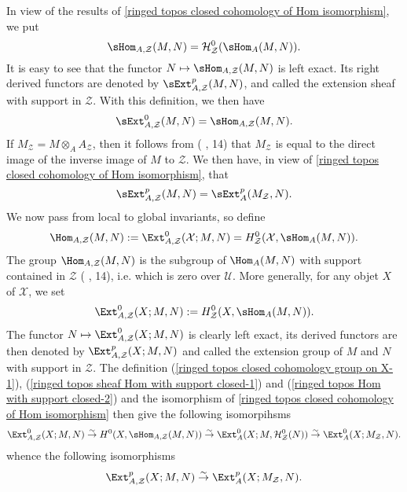 In view of the results of \cref{ringed topos closed cohomology of Hom isomorphism}, we put
\begin{equation}\label{ringed topos sheaf Hom with support closed-1}
\sHom_{A,\mathcal{Z}}(M,N)=\mathcal{H}^0_\mathcal{Z}(\sHom_A(M,N)).
\end{equation}
It is easy to see that the functor $N\mapsto\sHom_{A,\mathcal{Z}}(M,N)$ is left exact. Its right derived functors are denoted by $\sExt_{A,\mathcal{Z}}^p(M,N)$, and called the extension sheaf with support in $\mathcal{Z}$. With this definition, we then have
\begin{equation}\label{ringed topos sheaf Hom with support closed-2}
\sExt_{A,\mathcal{Z}}^0(M,N)=\sHom_{A,\mathcal{Z}}(M,N).
\end{equation}
If $M_\mathcal{Z}=M\otimes_AA_\mathcal{Z}$, then it follows from (\cite{SGA4-1} , 14) that $M_\mathcal{Z}$ is equal to the direct image of the inverse image of $M$ to $\mathcal{Z}$. We then have, in view of \cref{ringed topos closed cohomology of Hom isomorphism}, that
\begin{equation}\label{ringed topos sheaf Hom with support closed-3}
\sExt_{A,\mathcal{Z}}^p(M,N)=\sExt_A^p(M_\mathcal{Z},N).
\end{equation}
We now pass from local to global invariants, so define
\begin{equation}\label{ringed topos Hom with support closed-1}
\Hom_{A,\mathcal{Z}}(M,N):=\Ext_{A,\mathcal{Z}}^0(\mathcal{X};M,N)=H_\mathcal{Z}^0(\mathcal{X},\sHom_A(M,N)).
\end{equation}
The group $\Hom_{A,\mathcal{Z}}(M,N)$ is the subgroup of $\Hom_A(M,N)$ with support contained in $\mathcal{Z}$ (\cite{SGA4-1} , 14), i.e. which is zero over $\mathcal{U}$. More generally, for any objet $X$ of $\mathcal{X}$, we set
\begin{equation}\label{ringed topos Hom with support closed-2}
\Ext_{A,\mathcal{Z}}^0(X;M,N):=H_\mathcal{Z}^0(X,\sHom_A(M,N)).
\end{equation}
The functor $N\mapsto\Ext_{A,\mathcal{Z}}^0(X;M,N)$ is clearly left exact, its derived functors are then denoted by $\Ext_{A,\mathcal{Z}}^p(X;M,N)$ and called the extension group of $M$ and $N$ with support in $\mathcal{Z}$. The definition (\ref{ringed topos closed cohomology group on X-1}), (\ref{ringed topos sheaf Hom with support closed-1}) and (\ref{ringed topos Hom with support closed-2}) and the isomorphism of \cref{ringed topos closed cohomology of Hom isomorphism} then give the following isomorpihsms
\begin{equation}\label{ringed topos Hom with support closed-3}
\Ext_{A,\mathcal{Z}}^0(X;M,N) \stackrel{\sim}{\to } H^0(X,\sHom_{A,\mathcal{Z}}(M,N)) \stackrel{\sim}{\to } \Ext_A^0(X;M,\mathcal{H}_\mathcal{Z}^0(N)) \stackrel{\sim}{\to } \Ext_A^0(X;M_\mathcal{Z},N).
\end{equation}
whence the following isomorphisms
\begin{equation}\label{ringed topos Hom with support closed-4}
\Ext_{A,\mathcal{Z}}^p(X;M,N) \stackrel{\sim}{\to } \Ext_A^p(X;M_\mathcal{Z},N).
\end{equation}


